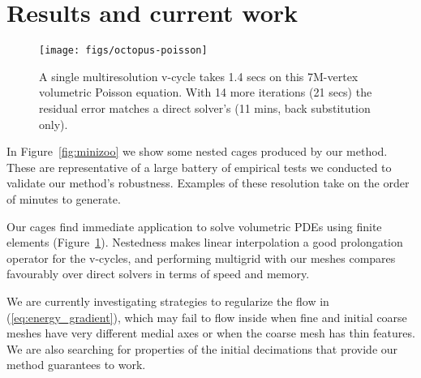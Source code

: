 \documentclass{cgyrf15}
\begin{document}
\section{Results and current work}


\begin{figure}[t]
  \texttt{[image: figs/octopus-poisson]}
  \caption{A single multiresolution v-cycle takes 1.4 secs on this 7M-vertex
  volumetric Poisson equation. With 14 more iterations (21 secs) the residual
  error matches a direct solver's (11 mins, back substitution only).}
  \label{fig:octopus}
  \vspace{-0.3cm}
\end{figure}

In Figure~\ref{fig:minizoo} we show some nested cages produced by our method.
%
These are representative of a large battery of empirical tests we conducted to
validate our method's robustness.
Examples of these resolution take on the order of minutes to generate. 

Our cages find immediate application to solve volumetric PDEs using finite
elements (Figure~\ref{fig:octopus}). Nestedness makes linear interpolation a
good prolongation operator for the v-cycles, and performing multigrid with our
meshes compares favourably over direct solvers in terms of speed and memory.


We are currently investigating strategies to regularize the flow in
(\ref{eq:energy_gradient}), which may fail to flow inside when fine and initial
coarse meshes have very different medial axes or when the coarse mesh has thin
features. We are also searching for properties of the initial decimations that
provide our method guarantees to work. 



 
\end{document}
